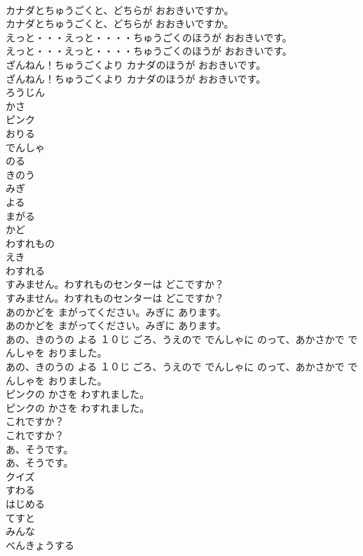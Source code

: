 \documentclass[8pt]{extreport}
\begin{document}
\begin{CJK}{UTF8}{min}
\\	カナダとちゅうごくと、どちらが おおきいですか。
\\	カナダとちゅうごくと、どちらが おおきいですか。
\\	えっと・・・えっと・・・・ちゅうごくのほうが おおきいです。
\\	えっと・・・えっと・・・・ちゅうごくのほうが おおきいです。
\\	ざんねん！ちゅうごくより カナダのほうが おおきいです。
\\	ざんねん！ちゅうごくより カナダのほうが おおきいです。
\\	ろうじん
\\	かさ
\\	ピンク
\\	おりる
\\	でんしゃ
\\	のる
\\	きのう
\\	みぎ
\\	よる
\\	まがる
\\	かど
\\	わすれもの
\\	えき
\\	わすれる
\\	すみません。わすれものセンターは どこですか？
\\	すみません。わすれものセンターは どこですか？
\\	あのかどを まがってください。みぎに あります。
\\	あのかどを まがってください。みぎに あります。
\\	あの、きのうの よる １０じ ごろ、うえので でんしゃに のって、あかさかで でんしゃを おりました。
\\	あの、きのうの よる １０じ ごろ、うえので でんしゃに のって、あかさかで でんしゃを おりました。
\\	ピンクの かさを わすれました。
\\	ピンクの かさを わすれました。
\\	これですか？
\\	これですか？
\\	あ、そうです。
\\	あ、そうです。
\\	クイズ
\\	すわる
\\	はじめる
\\	てすと
\\	みんな
\\	べんきょうする

\end{CJK}
\end{document}
